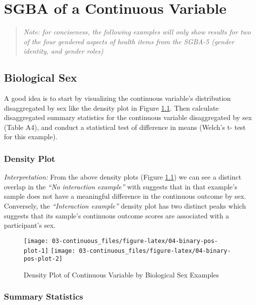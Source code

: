\documentclass[
]{book}
\begin{document}
\chapter{SGBA of a Continuous Variable}\label{continuous}

\begin{quote}
\emph{Note: for conciseness, the following examples will only show results for two of the four gendered aspects of health items from the SGBA-5 (gender identity, and gender roles)}
\end{quote}

\section{Biological Sex}\label{biological-sex}

A good idea is to start by visualizing the continuous variable's distribution disaggregated by sex like the density plot in Figure \ref{fig:04-binary-pos-plot}. Then calculate disaggregated summary statistics for the continuous variable disaggregated by sex (Table A4), and conduct a statistical test of difference in means (Welch's t- test for this example).

\subsection{Density Plot}\label{density-plot}

\emph{Interpretation:} From the above density plots (Figure \ref{fig:04-binary-pos-plot}) we can see a distinct overlap in the \emph{``No interaction example''} with suggests that in that example's sample does not have a meaningful difference in the continuous outcome by sex. Conversely, the \emph{``Interaction example''} density plot has two distinct peaks which suggests that its sample's continuous outcome scores are associated with a participant's sex.

\begin{figure}

{\centering \texttt{[image: 03-continuous\_files/figure-latex/04-binary-pos-plot-1]} \texttt{[image: 03-continuous\_files/figure-latex/04-binary-pos-plot-2]} 

}

\caption{Density Plot of Continuous Variable by Biological Sex Examples}\label{fig:04-binary-pos-plot}
\end{figure}

\subsection{Summary Statistics}\label{summary-statistics}
\end{document}
